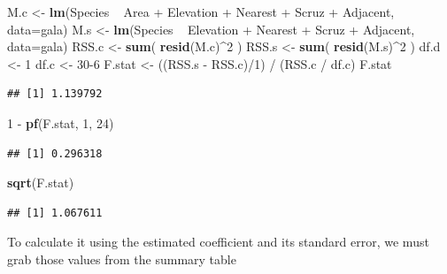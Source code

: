\documentclass[]{book}
\newenvironment{Shaded}{\begin{snugshade}}{\end{snugshade}}
\newcommand{\KeywordTok}[1]{\textcolor[rgb]{0.13,0.29,0.53}{\textbf{{#1}}}}
\newcommand{\DataTypeTok}[1]{\textcolor[rgb]{0.13,0.29,0.53}{{#1}}}
\newcommand{\DecValTok}[1]{\textcolor[rgb]{0.00,0.00,0.81}{{#1}}}
\newcommand{\StringTok}[1]{\textcolor[rgb]{0.31,0.60,0.02}{{#1}}}
\newcommand{\NormalTok}[1]{{#1}}
\theoremstyle{definition}
\theoremstyle{definition}
\theoremstyle{remark}
\begin{document}
\begin{Shaded}
\begin{Highlighting}[]
\NormalTok{M.c <-}\StringTok{ }\KeywordTok{lm}\NormalTok{(Species ~}\StringTok{ }\NormalTok{Area +}\StringTok{ }\NormalTok{Elevation +}\StringTok{ }\NormalTok{Nearest +}\StringTok{ }\NormalTok{Scruz +}\StringTok{ }\NormalTok{Adjacent, }\DataTypeTok{data=}\NormalTok{gala)}
\NormalTok{M.s <-}\StringTok{ }\KeywordTok{lm}\NormalTok{(Species ~}\StringTok{        }\NormalTok{Elevation +}\StringTok{ }\NormalTok{Nearest +}\StringTok{ }\NormalTok{Scruz +}\StringTok{ }\NormalTok{Adjacent, }\DataTypeTok{data=}\NormalTok{gala)}
\NormalTok{RSS.c <-}\StringTok{ }\KeywordTok{sum}\NormalTok{( }\KeywordTok{resid}\NormalTok{(M.c)^}\DecValTok{2} \NormalTok{)}
\NormalTok{RSS.s <-}\StringTok{ }\KeywordTok{sum}\NormalTok{( }\KeywordTok{resid}\NormalTok{(M.s)^}\DecValTok{2} \NormalTok{)}
\NormalTok{df.d <-}\StringTok{ }\DecValTok{1}
\NormalTok{df.c <-}\StringTok{ }\DecValTok{30-6}
\NormalTok{F.stat <-}\StringTok{ }\NormalTok{((RSS.s -}\StringTok{ }\NormalTok{RSS.c)/}\DecValTok{1}\NormalTok{) /}\StringTok{ }\NormalTok{(RSS.c /}\StringTok{ }\NormalTok{df.c)}
\NormalTok{F.stat}
\end{Highlighting}
\end{Shaded}

\begin{verbatim}
## [1] 1.139792
\end{verbatim}

\begin{Shaded}
\begin{Highlighting}[]
\DecValTok{1} \NormalTok{-}\StringTok{ }\KeywordTok{pf}\NormalTok{(F.stat, }\DecValTok{1}\NormalTok{, }\DecValTok{24}\NormalTok{)}
\end{Highlighting}
\end{Shaded}

\begin{verbatim}
## [1] 0.296318
\end{verbatim}

\begin{Shaded}
\begin{Highlighting}[]
\KeywordTok{sqrt}\NormalTok{(F.stat)}
\end{Highlighting}
\end{Shaded}

\begin{verbatim}
## [1] 1.067611
\end{verbatim}

To calculate it using the estimated coefficient and its standard error,
we must grab those values from the summary table
\end{document}
